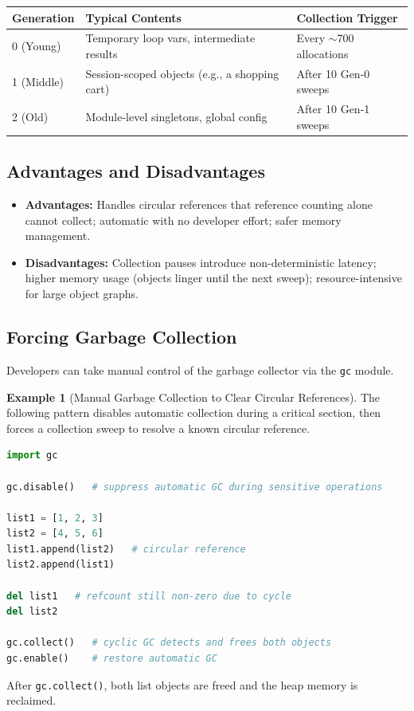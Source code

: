 \documentclass[11pt, a4paper, notitlepage]{report}
\theoremstyle{definition}
\theoremstyle{remark}
\theoremstyle{definition}
\newtheorem{example}[theorem]{Example}
\begin{document}
\begin{keyresult}[title={Key Result: Generational GC Thresholds (Default)}]
\begin{center}
\begin{tabularx}{\linewidth}{@{}l X l@{}}
\toprule
\textbf{Generation} & \textbf{Typical Contents} & \textbf{Collection Trigger} \\
\midrule
0 (Young) & Temporary loop vars, intermediate results & Every $\sim$700 allocations \\
1 (Middle) & Session-scoped objects (e.g., a shopping cart) & After 10 Gen-0 sweeps \\
2 (Old) & Module-level singletons, global config & After 10 Gen-1 sweeps \\
\bottomrule
\end{tabularx}
\end{center}
\end{keyresult}

\subsection{Advantages and Disadvantages}
\label{subsec:gc-tradeoffs}

\begin{itemize}
  \item \textbf{Advantages:} Handles circular references that reference counting alone cannot
        collect; automatic with no developer effort; safer memory management.
  \item \textbf{Disadvantages:} Collection pauses introduce non-deterministic latency;
        higher memory usage (objects linger until the next sweep); resource-intensive for
        large object graphs.
\end{itemize}

\subsection{Forcing Garbage Collection}
\label{subsec:force-gc}

Developers can take manual control of the garbage collector via the \texttt{gc} module.

\begin{example}[Manual Garbage Collection to Clear Circular References]
The following pattern disables automatic collection during a critical section, then forces a
collection sweep to resolve a known circular reference.
\begin{lstlisting}[language=Python]
import gc

gc.disable()   # suppress automatic GC during sensitive operations

list1 = [1, 2, 3]
list2 = [4, 5, 6]
list1.append(list2)   # circular reference
list2.append(list1)

del list1   # refcount still non-zero due to cycle
del list2

gc.collect()   # cyclic GC detects and frees both objects
gc.enable()    # restore automatic GC
\end{lstlisting}
After \texttt{gc.collect()}, both list objects are freed and the heap memory is reclaimed.
\end{example}
\end{document}
